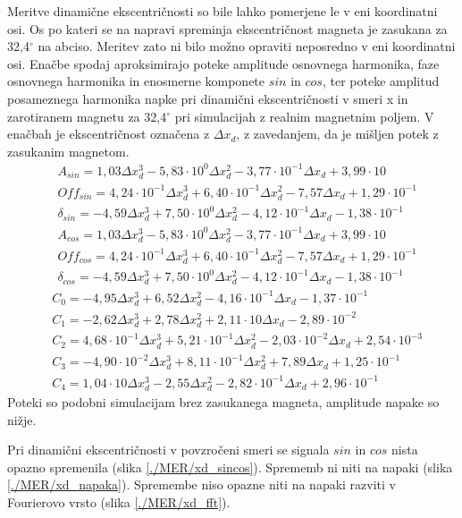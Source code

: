 Meritve dinamične ekscentričnosti so bile lahko pomerjene le v eni koordinatni osi. Os po kateri se na napravi spreminja ekscentričnost magneta je zasukana za 32,4$^\circ$ na abciso. Meritev zato ni bilo možno opraviti neposredno v eni koordinatni osi. Enačbe spodaj aproksimirajo poteke amplitude osnovnega harmonika, faze osnovnega harmonika in enosmerne komponete $sin$ in $cos$, ter poteke amplitud posameznega harmonika napke pri dinamični ekscentričnosti v smeri x in zarotiranem magnetu za 32,4$^\circ$ pri simulacijah z realnim magnetnim poljem. V enačbah je ekscentričnost označena z $\Delta x_{d}$, z zavedanjem, da je mišljen potek z zasukanim magnetom. 
\begin{eqnarray}
&A_{sin}=1,03\Delta x_d^3-5,83\cdot10^{0}\Delta x_d^2-3,77\cdot10^{-1}\Delta x_d+3,99\cdot10\\
&Off_{sin}=4,24\cdot10^{-1}\Delta x_d^3+6,40\cdot10^{-1}\Delta x_d^2-7,57\Delta x_d+1,29\cdot10^{-1}\\
&\delta_{sin}=-4,59\Delta x_d^3+7,50\cdot10^{0}\Delta x_d^2-4,12\cdot10^{-1}\Delta x_d-1,38\cdot10^{-1}\\
&A_{cos}=1,03\Delta x_d^3-5,83\cdot10^{0}\Delta x_d^2-3,77\cdot10^{-1}\Delta x_d+3,99\cdot10\\
&Off_{cos}=4,24\cdot10^{-1}\Delta x_d^3+6,40\cdot10^{-1}\Delta x_d^2-7,57\Delta x_d+1,29\cdot10^{-1}\\
&\delta_{cos}=-4,59\Delta x_d^3+7,50\cdot10^{0}\Delta x_d^2-4,12\cdot10^{-1}\Delta x_d-1,38\cdot10^{-1}
\end{eqnarray}
\begin{eqnarray}
&C_0 =-4,95\Delta x_d^{3}+6,52\Delta x_d^{2}-4,16\cdot 10^{-1}\Delta x_d-1,37\cdot 10^{-1} \\                         
&C_1 =-2,62\Delta x_d^{3}+2,78\Delta x_d^{2}+2,11\cdot 10\Delta x_d-2,89\cdot 10^{-2} \\                              
&C_2 =4,68\cdot 10^{-1}\Delta x_d^{3}+5,21\cdot 10^{-1}\Delta x_d^{2}-2,03\cdot 10^{-2}\Delta x_d+2,54\cdot 10^{-3} \\
&C_3 =-4,90\cdot 10^{-2}\Delta x_d^{3}+8,11\cdot 10^{-1}\Delta x_d^{2}+7,89\Delta x_d+1,25\cdot 10^{-1} \\            
&C_4 =1,04\cdot 10\Delta x_d^{3}-2,55\Delta x_d^{2}-2,82\cdot 10^{-1}\Delta x_d+2,96\cdot 10^{-1}
\end{eqnarray}
Poteki so podobni simulacijam brez zasukanega magneta, amplitude napake so nižje.

Pri dinamični ekscentričnosti v povzročeni smeri se signala $sin$ in $cos$ nista opazno spremenila (slika \ref{./MER/xd_sincos}). Sprememb ni niti na napaki (slika \ref{./MER/xd_napaka}). Spremembe niso opazne niti na  napaki razviti v Fourierovo vrsto (slika \ref{./MER/xd_fft}).
